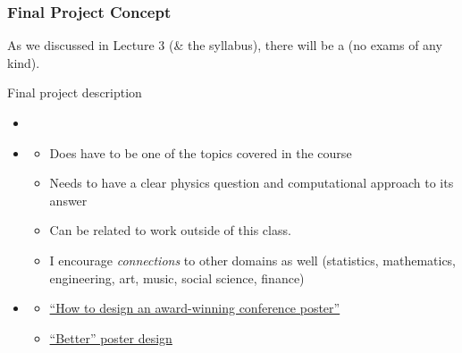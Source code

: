 \documentclass[hyperref={colorlinks=true}]{beamer}
\begin{document}
\begin{frame}%
  \frametitle{Final Project Concept}

  As we discussed in Lecture 3 (\& the syllabus), there will be a  (no exams of any kind).
  
  \vspace{0.3cm}
  
  \begin{ucblock}{Final project  description}
    \begin{itemize}
      \item {}
      \item {}
      \begin{itemize}
        \item Does  have to be one of the topics covered in the course
        \item Needs to have a clear physics question and computational approach to its answer
        \item Can be related to work outside of this class. 
        \item I encourage \textit{connections} to other domains as well (statistics, mathematics, engineering, art, music, social science, finance)
      \end{itemize}
      \item {}
      \begin{itemize}
        \item \href{http://blogs.lse.ac.uk/impactofsocialsciences/2018/05/11/how-to-design-an-award-winning-conference-poster/}{``How to design an award-winning conference poster''}
        \item \href{https://raw.githubusercontent.com/rafaelbailo/betterposter-latex-template/master/example.png}{``Better'' poster design}
      \end{itemize}
    \end{itemize}
  \end{ucblock}

  
\end{frame}

\end{document}
